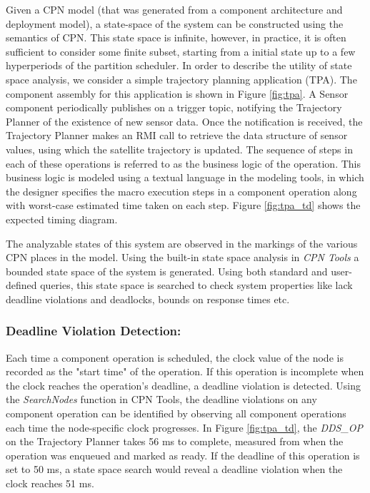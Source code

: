 Given a CPN model (that was generated from a component architecture and deployment model), a state-space of the system can be constructed using the semantics of CPN. This state space is infinite, however, in practice, it is often sufficient to consider some finite subset, starting from a initial state up to a few hyperperiods of the partition scheduler. In order to describe the utility of state space analysis, we consider a simple trajectory planning application (TPA). The component assembly for this application is shown in Figure \ref{fig:tpa}. A Sensor component periodically publishes on a trigger topic, notifying the Trajectory Planner of the existence of new sensor data. Once the notification is received, the Trajectory Planner makes an RMI call to retrieve the data structure of sensor values, using which the satellite trajectory is updated. The sequence of steps in each of these operations is referred to as the business logic of the operation. This business logic is modeled using a textual language in the modeling tools, in which the designer specifies the macro execution steps in a component operation along with worst-case estimated time taken on each step. Figure \ref{fig:tpa_td} shows the expected timing diagram. 

The analyzable states of this system are observed in the markings of the various CPN places in the model. Using the built-in state space analysis in \textit{CPN Tools} a bounded state space of the system is generated. Using both standard and user-defined queries, this state space is searched to check system properties like lack deadline violations and deadlocks, bounds on response times etc.

\vspace{-0.1in}

\subsubsection{Deadline Violation Detection:}

Each time a component operation is scheduled, the clock value of the node is recorded as the "start time" of the operation. If this operation is incomplete when the clock reaches the operation's deadline, a deadline violation is detected. Using the \emph{SearchNodes} function in CPN Tools, the deadline violations on any component operation can be identified by observing all component operations each time the node-specific clock progresses. In Figure \ref{fig:tpa_td}, the \emph{DDS\_OP} on the Trajectory Planner takes 56 ms to complete, measured from when the operation was enqueued and marked as ready. If the deadline of this operation is set to 50 ms, a state space search would reveal a deadline violation when the clock reaches 51 ms.

